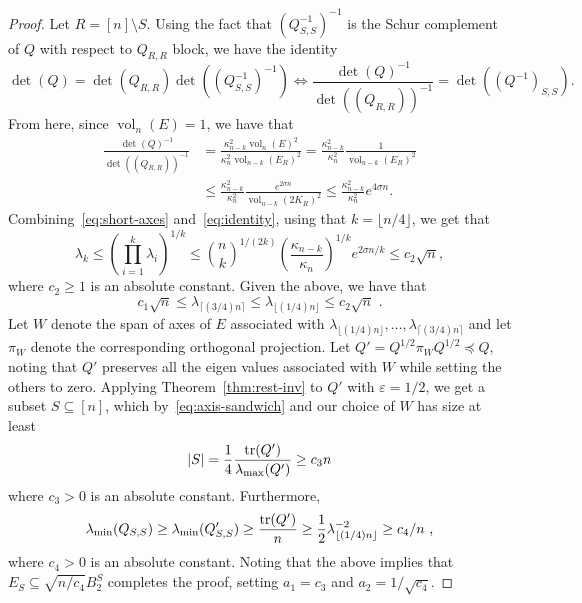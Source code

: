\documentclass[11pt]{article}
\newcommand{\ceil}[1]{\lceil #1 \rceil}
\newcommand{\floor}[1]{\lfloor #1 \rfloor}
\newcommand\eps{\varepsilon}
\DeclareMathOperator{\vol}{vol}
\DeclareMathOperator{\tr}{tr}
\begin{document}
\begin{proof}
Let $R = [n] \setminus S$. Using the fact that $(Q^{-1}_{S,S})^{-1}$ is the
Schur complement of $Q$ with respect to $Q_{R,R}$ block, we have the identity 
\begin{equation}
\det(Q) = \det(Q_{R,R}) \det((Q^{-1}_{S,S})^{-1}) \Leftrightarrow
\frac{\det(Q)^{-1}}{\det((Q_{R,R}))^{-1}} = \det((Q^{-1})_{S,S}) .
\end{equation}
From here, since $\vol_n(E)=1$, we have that
\begin{equation}
\label{eq:identity}
\begin{split}
\frac{\det(Q)^{-1}}{\det((Q_{R,R}))^{-1}} &= \frac{\kappa^2_{n-k}
\vol_n(E)^2}{\kappa^2_n \vol_{n-k}(E_R)^2} = \frac{\kappa^2_{n-k}}{\kappa_n^2}
\frac{1}{\vol_{n-k}(E_R)^2} \\
&\leq \frac{\kappa^2_{n-k}}{\kappa_n^2} \frac{e^{2\sigma n}}{\vol_{n-k}(2K_R)^2}
\leq \frac{\kappa^2_{n-k}}{\kappa_n^2} e^{4\sigma n}.
\end{split}
\end{equation}
Combining~\eqref{eq:short-axes} and~\eqref{eq:identity}, using that $k =
\floor{n/4}$, we get that
\begin{equation}
\label{eq:axes-short}
\lambda_k \leq (\prod_{i=1}^k \lambda_i)^{1/k} \leq \binom{n}{k}^{1/(2k)}
(\frac{\kappa_{n-k}}{\kappa_n})^{1/k} e^{2\sigma n/k} \leq c_2 \sqrt{n},
\end{equation}
where $c_2 \geq 1$ is an absolute constant. Given the above, we have that
\begin{equation}
\label{eq:axis-sandwich}
c_1 \sqrt{n} \leq \lambda_{\ceil{(3/4)n}} \leq \lambda_{\floor{(1/4)n}} \leq c_2
\sqrt{n} \text{ .}
\end{equation}
Let $W$ denote the span of axes of $E$ associated with
$\lambda_{\floor{(1/4)n}},\dots,\lambda_{\ceil{(3/4)n}}$ and let $\pi_W$ denote
the corresponding orthogonal projection. Let $Q' = Q^{1/2}\pi_WQ^{1/2} \preceq
Q$, noting that $Q'$ preserves all the eigen values associated with $W$ while
setting the others to zero. Applying Theorem~\ref{thm:rest-inv} to $Q'$ with
$\eps=1/2$, we get a subset $S \subseteq [n]$, which by~\eqref{eq:axis-sandwich}
and our choice of $W$ has size at least
\[
|S| = \frac{1}{4} \frac{\tr(Q')}{\lambda_{\rm max}(Q')} \geq c_3 n
\]  
where $c_3 > 0$ is an absolute constant. Furthermore,
\[
\lambda_{\rm \min}(Q_{S,S}) \geq \lambda_{\rm min}(Q'_{S,S}) \geq
\frac{\tr(Q')}{n} \geq \frac{1}{2} \lambda_{\floor{(1/4)n}}^{-2} \geq c_4/n \text{ ,}
\]
where $c_4 > 0$ is an absolute constant. Noting that the above implies that
$E_S \subseteq \sqrt{n/c_4} B_2^S$ completes the proof, setting $a_1 = c_3$ and
$a_2 = 1/\sqrt{c_4}$.
\end{proof}
\end{document}
